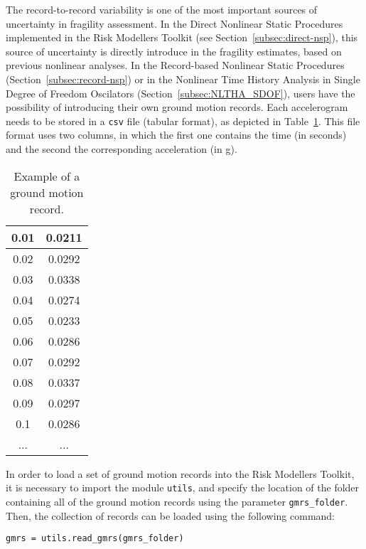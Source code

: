 The record-to-record variability is one of the most important sources of uncertainty in fragility assessment. In the Direct Nonlinear Static Procedures implemented in the Risk Modellers Toolkit (see Section~\ref{subsec:direct-nsp}), this source of uncertainty is directly introduce in the fragility estimates, based on previous nonlinear analyses. In the Record-based Nonlinear Static Procedures (Section~\ref{subsec:record-nsp}) or in the Nonlinear Time History Analysis in Single Degree of Freedom Oscilators (Section~\ref{subsec:NLTHA_SDOF}), users have the possibility of introducing their own ground motion records. Each accelerogram needs to be stored in a \verb=csv= file (tabular format), as depicted in Table~\ref{table:gmr}. This file format uses two columns, in which the first one contains the time (in seconds) and the second the corresponding acceleration (in g).\\

\begin {table}[htb]
\caption{Example of a ground motion record.}
\label{table:gmr}
\begin{center}
  \begin{tabular}{ | c | c |}
  \hline
0.01 & 0.0211 \\ \hline
0.02 & 0.0292 \\ \hline
0.03 & 0.0338 \\ \hline
0.04 & 0.0274 \\ \hline
0.05 & 0.0233 \\ \hline
0.06 & 0.0286 \\ \hline
0.07 & 0.0292 \\ \hline
0.08 & 0.0337 \\ \hline
0.09 & 0.0297 \\ \hline
0.1 & 0.0286 \\ \hline
... & ...  \\ \hline
  \end{tabular}
\end{center}
\end{table}

In order to load a set of ground motion records into the Risk Modellers Toolkit, it is necessary to import the module \verb=utils=, and specify the location of the folder containing all of the ground motion records using the parameter \verb=gmrs_folder=. Then, the collection of records can be loaded using the following command:

\begin{Verbatim}[frame=single, commandchars=\\\{\}, samepage=true]
gmrs = utils.read_gmrs(gmrs_folder)
\end{Verbatim}

